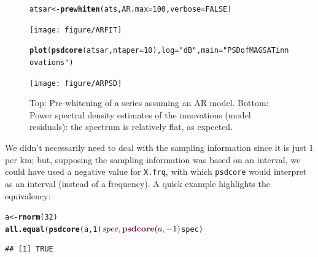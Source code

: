 \documentclass{article}\usepackage{graphicx, color}
\makeatletter
\newcommand{\hlfunctioncall}[1]{\textcolor[rgb]{0.501960784313725,0,0.329411764705882}{\textbf{#1}}}%
\newcommand{\hlstring}[1]{\textcolor[rgb]{0.6,0.6,1}{#1}}%
\newenvironment{kframe}{%
 \def\at@end@of@kframe{}%
 \ifinner\ifhmode%
  \def\at@end@of@kframe{\end{minipage}}%
  \begin{minipage}{\columnwidth}%
 \fi\fi%
 \def\FrameCommand##1{\hskip\@totalleftmargin \hskip-\fboxsep
 \colorbox{shadecolor}{##1}\hskip-\fboxsep
     \hskip-\linewidth \hskip-\@totalleftmargin \hskip\columnwidth}%
 \MakeFramed {\advance\hsize-\width
   \@totalleftmargin\z@ \linewidth\hsize
   \@setminipage}}%
 {\par\unskip\endMakeFramed%
 \at@end@of@kframe}
\newenvironment{knitrout}{}{} %
\newcommand{\Rcmd}[1]{\texttt{#1}}
\makeatother
\begin{document}
\begin{figure}[htb!]
\begin{center}
\begin{knitrout}
\color{fgcolor}\begin{kframe}
\begin{alltt}
atsar <- \hlfunctioncall{prewhiten}(ats, AR.max = 100, verbose = FALSE)
\end{alltt}
\end{kframe}
\texttt{[image: figure/ARFIT]} 

\end{knitrout}

\begin{knitrout}
\color{fgcolor}\begin{kframe}
\begin{alltt}
\hlfunctioncall{plot}(\hlfunctioncall{psdcore}(atsar, ntaper = 10), log = \hlstring{"dB"}, main = \hlstring{"PSD of MAGSAT innovations"})
\end{alltt}
\end{kframe}
\texttt{[image: figure/ARPSD]} 

\end{knitrout}

\caption{Top: Pre-whitening of a series assuming an AR model.
Bottom: Power spectral density estimates of the innovations (model residuals):
the spectrum is relatively flat, as expected.}
\label{fig:magd}
\end{center}
\end{figure}

We didn't necessarily need to deal with the sampling information since it is just 1 per km;
but, supposing the sampling information was based on an interval, we
could have used
a negative value for \Rcmd{X.frq}, 
with which \Rcmd{psdcore}
would interpret as
an interval (instead of a frequency). 
A quick example highlights the equivalency:
\begin{knitrout}
\color{fgcolor}\begin{kframe}
\begin{alltt}
a <- \hlfunctioncall{rnorm}(32)
\hlfunctioncall{all.equal}(\hlfunctioncall{psdcore}(a, 1)$spec, \hlfunctioncall{psdcore}(a, -1)$spec)
\end{alltt}
\begin{verbatim}
## [1] TRUE
\end{verbatim}
\end{kframe}
\end{knitrout}
\end{document}
